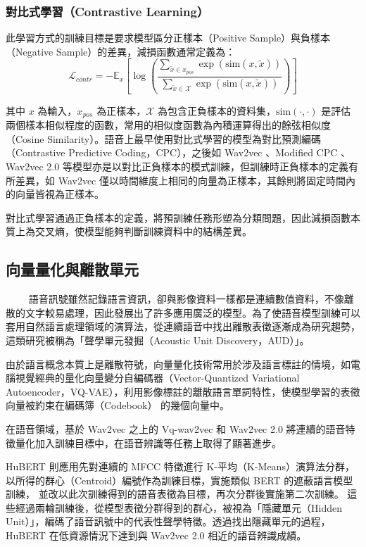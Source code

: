 \subsubsection{對比式學習（Contrastive Learning）}

此學習方式的訓練目標是要求模型區分正樣本（Positive Sample）與負樣本（Negative Sample）的差異，減損函數通常定義為：
$$\mathcal{L}_{contr} = -\mathbb{E}_x\left[\log
\left(
{\frac
{\sum_{\tilde{x} \in x_{pos}}\exp(\text{sim}(x, \tilde{x}))}
{\sum_{\tilde{x} \in \mathcal{X}}\exp(\text{sim}(x, \tilde{x}))}
}\right)\right]$$

其中 $x$ 為輸入，$x_{pos}$ 為正樣本，$\mathcal{X}$ 為包含正負樣本的資料集，$\text{sim}(\cdot, \cdot)$ 是評估兩個樣本相似程度的函數，常用的相似度函數為內積運算得出的餘弦相似度（Cosine Similarity）。語音上最早使用對比式學習的模型為對比預測編碼（Contrastive Predictive Coding，CPC）\cite{maekaku2022speech}，之後如 Wav2vec \cite{schneider2019wav2vec}、Modified CPC \cite{rivière2020unsupervised}、Wav2vec 2.0 \cite{baevski2020wav2vec} 等模型亦是以對比正負樣本的模式訓練，但訓練時正負樣本的定義有所差異，如 Wav2vec 僅以時間維度上相同的向量為正樣本，其餘則將固定時間內的向量皆視為正樣本。

對比式學習通過正負樣本的定義，將預訓練任務形塑為分類問題，因此減損函數本質上為交叉熵，使模型能夠判斷訓練資料中的結構差異。

\subsection{向量量化與離散單元}
　　
語音訊號雖然記錄語言資訊，卻與影像資料一樣都是連續數值資料，不像離散的文字較易處理，因此發展出了許多應用廣泛的模型。為了使語音模型訓練可以套用自然語言處理領域的演算法，從連續語音中找出離散表徵逐漸成為研究趨勢，這類研究被稱為「聲學單元發掘（Acoustic Unit Discovery，AUD）」。

由於語言概念本質上是離散符號，向量量化技術常用於涉及語言標註的情境，如電腦視覺經典的量化向量變分自編碼器（Vector-Quantized Variational Autoencoder，VQ-VAE）\cite{van2017neural}，利用影像標註的離散語言單詞特性，使模型學習的表徵向量被約束在編碼簿（Codebook） 的幾個向量中。

在語音領域，基於 Wav2vec 之上的 Vq-wav2vec \cite{baevski2019vq} 和 Wav2vec 2.0 將連續的語音特徵量化加入訓練目標中，在語音辨識等任務上取得了顯著進步。

HuBERT \cite{hsu_hubert_2021-2} 則應用先對連續的 MFCC 特徵進行 K-平均（K-Means）演算法分群，以所得的群心（Centroid）編號作為訓練目標，實施類似 BERT 的遮蔽語言模型訓練，
並改以此次訓練得到的語音表徵為目標，再次分群後實施第二次訓練。 
這些經過兩輪訓練後，從模型表徵分群得到的群心，被視為「隱藏單元（Hidden Unit）」，編碼了語音訊號中的代表性聲學特徵。透過找出隱藏單元的過程，HuBERT 在低資源情況下達到與 Wav2vec 2.0 相近的語音辨識成績。

